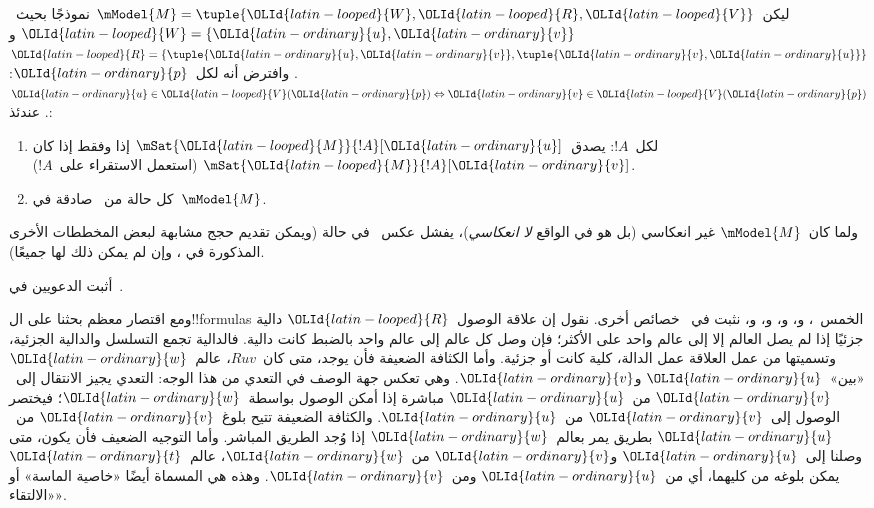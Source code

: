 \documentclass[../../../include/open-logic-section]{subfiles}
\begin{document}
\begin{prop}
  ليكن~$\mModel{M} = \tuple{{\OLId{latin-looped}{W}}, {\OLId{latin-looped}{R}}, {\OLId{latin-looped}{V}}}$ نموذجًا بحيث~${\OLId{latin-looped}{W}} = \{{\OLId{latin-ordinary}{u}}, {\OLId{latin-ordinary}{v}}\}$
  و${\OLId{latin-looped}{R}} = \{\tuple{{\OLId{latin-ordinary}{u}},{\OLId{latin-ordinary}{v}}}, \tuple{{\OLId{latin-ordinary}{v}},{\OLId{latin-ordinary}{u}}}\}$. وافترض أنه لكل~${\OLId{latin-ordinary}{p}}$:
  ${\OLId{latin-ordinary}{u}} \in {\OLId{latin-looped}{V}}({\OLId{latin-ordinary}{p}}) \Leftrightarrow {\OLId{latin-ordinary}{v}} \in {\OLId{latin-looped}{V}}({\OLId{latin-ordinary}{p}})$. عندئذ:
  \begin{enumerate}
  \item لكل~$!A$: يصدق~$\mSat{{\OLId{latin-looped}{M}}}{!A}[{\OLId{latin-ordinary}{u}}]$ إذا وفقط إذا كان
    $\mSat{{\OLId{latin-looped}{M}}}{!A}[{\OLId{latin-ordinary}{v}}]$ (استعمل الاستقراء على~$!A$).
  \item كل حالة من~ صادقة في~$\mModel{M}$.
  \end{enumerate}
  ولما كان~$\mModel{M}$ غير انعكاسي (بل هو في الواقع
  \emph{لا انعكاسي})، يفشل عكس~ في حالة
   (ويمكن تقديم حجج مشابهة لبعض المخططات الأخرى المذكورة في
  ، وإن لم يمكن ذلك لها جميعًا).
\end{prop}

\begin{prob}
  أثبت الدعويين في~.
\end{prob}

ومع اقتصار معظم بحثنا على ال!!{formula}s الخمس~، و،
و، و، و، نثبت في~
خصائص أخرى. نقول إن علاقة الوصول~${\OLId{latin-looped}{R}}$ دالية جزئيًا إذا لم يصل
العالم إلا إلى عالم واحد على الأكثر؛ فإن وصل كل عالم إلى عالم واحد
بالضبط كانت دالية. فالدالية تجمع التسلسل والدالية الجزئية، وتسميتها
من عمل العلاقة عمل الدالة، كلية كانت أو جزئية.
وأما الكثافة الضعيفة فأن يوجد، متى كان~$Ruv$، عالم~${\OLId{latin-ordinary}{w}}$
«بين»~${\OLId{latin-ordinary}{u}}$ و${\OLId{latin-ordinary}{v}}$. وهي تعكس جهة الوصف في التعدي من هذا الوجه:
التعدي يجيز الانتقال إلى~${\OLId{latin-ordinary}{v}}$ من~${\OLId{latin-ordinary}{u}}$ مباشرة إذا أمكن الوصول
بواسطة~${\OLId{latin-ordinary}{w}}$؛ فيختصر الوصول إلى~${\OLId{latin-ordinary}{v}}$ من~${\OLId{latin-ordinary}{u}}$.
والكثافة الضعيفة تتيح بلوغ~${\OLId{latin-ordinary}{v}}$ من~${\OLId{latin-ordinary}{u}}$ بطريق يمر بعالم~${\OLId{latin-ordinary}{w}}$
إذا وُجد الطريق المباشر.
وأما التوجيه الضعيف فأن يكون، متى وصلنا إلى~${\OLId{latin-ordinary}{u}}$ و${\OLId{latin-ordinary}{v}}$ من~${\OLId{latin-ordinary}{w}}$،
عالم~${\OLId{latin-ordinary}{t}}$ يمكن بلوغه من كليهما، أي من~${\OLId{latin-ordinary}{u}}$ ومن~${\OLId{latin-ordinary}{v}}$.
وهذه هي المسماة أيضًا «خاصية الماسة» أو «الالتقاء».
\end{document}
